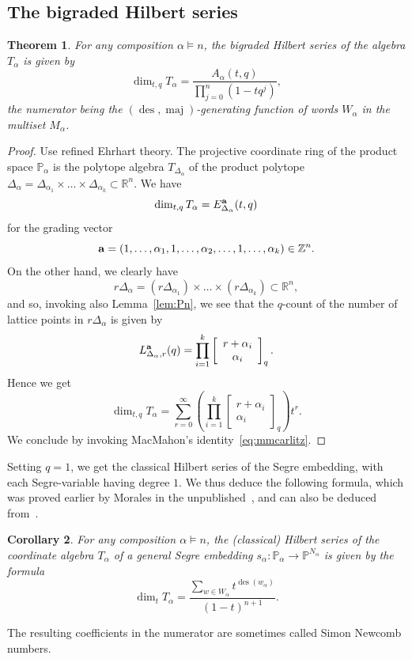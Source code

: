 \documentclass[a4paper,11pt]{amsart}
\theoremstyle{plain}
\newtheorem{theorem}{Theorem}[section]
\newtheorem{corollary}[theorem]{Corollary}
\theoremstyle{definition}
\newcommand{\pa}{T} %
\renewcommand{\P}{\mathbb{P}}
\newcommand{\R}{\mathbb{R}}
\newcommand{\Z}{\mathbb{Z}}
\DeclareMathOperator{\maj}{maj}
\DeclareMathOperator{\des}{des}
\newcommand{\ba}{{\bf a}}
\begin{document}
\subsection{The bigraded Hilbert series}
\begin{theorem} For any composition $\alpha \vDash n$, the bigraded Hilbert series of the algebra $\pa_\alpha$ is given by
\[
\dim_{t,q}  \pa_\alpha=  \frac{A_\alpha(t,q)}{\prod_{j=0}^n (1-tq^j)},
\]
the numerator being the $(\des, \maj)$-generating function of words $W_\alpha$ in the multiset $M_\alpha$. \label{thm:bigradedPa}
\end{theorem}
\begin{proof} Use refined Ehrhart theory. The projective
coordinate ring of the product space $\P_\alpha$ is the polytope algebra $\pa_{\Delta_\alpha}$ of the product
polytope $\Delta_\alpha=\Delta_{\alpha_1} \times \ldots \times \Delta_{\alpha_k}\subset\R^n$. We 
have 
\[\dim_{t,q}\pa_\alpha = E^\ba_{\Delta_\alpha}(t,q)\]
for the grading vector \[\ba=(1,\ldots, \alpha_1, 1,\ldots, \alpha_2, \ldots, 1, \ldots, \alpha_k)\in\Z^n.\]
On the other hand, we clearly have
\[r\Delta_\alpha=(r\Delta_{\alpha_1}) \times \ldots \times (r\Delta_{\alpha_k})\subset\R^n,\]
and so, invoking also Lemma~\ref{lem:Pn}, we see that the $q$-count of the 
number of lattice points in $r\Delta_\alpha$ is given by 
\[L^\ba_{\Delta_\alpha,r}(q) =\prod_{i=1}^k  \left[\begin{array}{c} r+\alpha_i\\ \alpha_i\end{array}\right]_q.\]
Hence we get 
\[ 
\dim_{t,q}  \pa_\alpha=\sum_{r=0}^\infty \left(\prod_{i=1}^k  \left[\begin{array}{c} r+\alpha_i\\ \alpha_i\end{array}\right]_q\right) t^r. 
\]
We conclude by invoking MacMahon's identity~\eqref{eq:mmcarlitz}.
\end{proof}
Setting $q=1$, we get the classical Hilbert series of the Segre embedding, with each Segre-variable having degree $1$. We thus deduce the following formula, which was proved earlier by Morales in the unpublished~\cite{morales}, and can also be deduced from~\cite{ORS}.
\begin{corollary} \label{cor:nemcomb}
For any composition $\alpha \vDash n$, the (classical) Hilbert series of the coordinate algebra $\pa_\alpha$ of a general Segre embedding $s_\alpha\colon \P_\alpha \rightarrow \P^{N_\alpha}$ is given by the formula 
\[
\dim_t \pa_\alpha=\frac{\displaystyle\sum_{w\in W_\alpha}t^{\des(w_\alpha)}}{(1-t)^{n+1}}. 
\]
\end{corollary}
The resulting coefficients in the numerator are sometimes called Simon Newcomb numbers. 
\end{document}
